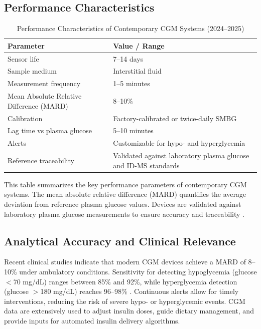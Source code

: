 \documentclass[12pt,a4paper]{article}  %
\begin{document}
\subsection{Performance Characteristics}
\FloatBarrier
\begin{table}[h!]
\centering
\caption{Performance Characteristics of Contemporary CGM Systems (2024--2025)}
\begin{tabularx}{\textwidth}{l X}
\hline
\textbf{Parameter} & \textbf{Value / Range} \\
\hline
Sensor life & 7--14 days \\
Sample medium & Interstitial fluid \\
Measurement frequency & 1--5 minutes \\
Mean Absolute Relative Difference (MARD) & 8--10\% \\
Calibration & Factory-calibrated or twice-daily SMBG \\
Lag time vs plasma glucose & 5--10 minutes \\
Alerts & Customizable for hypo- and hyperglycemia \\
Reference traceability & Validated against laboratory plasma glucose and ID-MS standards \\
\hline
\end{tabularx}
\label{tab:cgm_performance}
\end{table}
\FloatBarrier

This table summarizes the key performance parameters of contemporary CGM systems. The mean absolute relative difference (MARD) quantifies the average deviation from reference plasma glucose values. Devices are validated against laboratory plasma glucose measurements to ensure accuracy and traceability \cite{Sinocare_CGM_2025}.

\subsection{Analytical Accuracy and Clinical Relevance}
Recent clinical studies indicate that modern CGM devices achieve a MARD of 8--10\% under ambulatory conditions. Sensitivity for detecting hypoglycemia (glucose $<$70 mg/dL) ranges between 85\% and 92\%, while hyperglycemia detection (glucose $>$180 mg/dL) reaches 96--98\% \cite{CGM_Routine_Care_2024}. Continuous alerts allow for timely interventions, reducing the risk of severe hypo- or hyperglycemic events. CGM data are extensively used to adjust insulin doses, guide dietary management, and provide inputs for automated insulin delivery algorithms.
\end{document}
